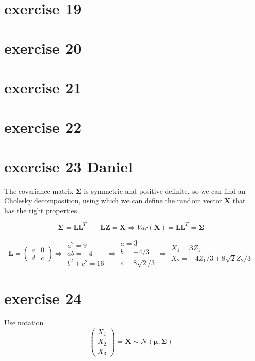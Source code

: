 \documentclass{article}
\let\normalmu\mu
\let\normalSigma\Sigma
\renewcommand{\mu}{\bm{\normalmu}} %
\renewcommand{\Sigma}{\bm{\normalSigma}} %
\begin{document}
\section{exercise 19}
\section{exercise 20}
\section{exercise 21}

\section{exercise 22}
\section{exercise 23 Daniel}
The covariance matrix $\mathbf{\Sigma}$ is symmetric and positive definite,
so we can find an Cholesky decomposition,
using which we can define the random vector $\mathbf{X}$ that has the right properties.

\[{\mathbf{\Sigma }} = {\mathbf{L}}{{\mathbf{L}}^T}\qquad {\mathbf{LZ}} = {\mathbf{X}} \Rightarrow Var\left( {\mathbf{X}} \right) = {\mathbf{L}}{{\mathbf{L}}^T} = {\mathbf{\Sigma }}\]

\[{\mathbf{L}} = \left( {\begin{array}{*{20}{c}}
            a & 0 \\
            d & c
        \end{array}} \right) \Rightarrow \begin{array}{*{20}{c}}
        {{a^2} = 9} \\
        {ab =  - 4} \\
        {{b^2} + {c^2} = 16}
    \end{array} \Rightarrow \begin{array}{*{20}{c}}
        {a = 3}      \\
        {b =  - 4/3} \\
        {c = 8\sqrt 2 /3}
    \end{array} \Rightarrow \begin{array}{*{20}{c}}
        {{X_1} = 3{Z_1}} \\
        {{X_2} =  - 4{Z_1}/3 + 8\sqrt 2 {Z_2}/3}
    \end{array}
\]

\section{exercise 24}
Use notation
\[\left( {\begin{array}{*{20}{c}}
            {{X_1}} \\
            {{X_2}} \\
            {{X_3}}
        \end{array}} \right) = {\mathbf{X}}\sim\mathcal{N}\left( {{\mathbf{\mu }},{\mathbf{\Sigma }}} \right)\]
\end{document}
